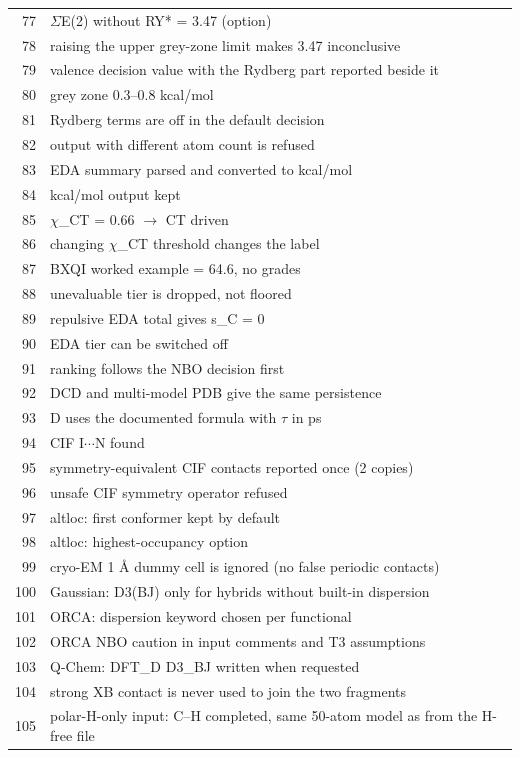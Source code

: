 {\begin{longtable}{rp{14.5cm}}
77 & $\Sigma$E(2) without RY* = 3.47 (option)\\
78 & raising the upper grey-zone limit makes 3.47 inconclusive\\
79 & valence decision value with the Rydberg part reported beside it\\
80 & grey zone 0.3--0.8 kcal/mol\\
81 & Rydberg terms are off in the default decision\\
82 & output with different atom count is refused\\
83 & EDA summary parsed and converted to kcal/mol\\
84 & kcal/mol output kept\\
85 & $\chi$\_CT = 0.66 $\to$ CT driven\\
86 & changing $\chi$\_CT threshold changes the label\\
87 & BXQI worked example = 64.6, no grades\\
88 & unevaluable tier is dropped, not floored\\
89 & repulsive EDA total gives s\_C = 0\\
90 & EDA tier can be switched off\\
91 & ranking follows the NBO decision first\\
92 & DCD and multi-model PDB give the same persistence\\
93 & D uses the documented formula with $\tau$ in ps\\
94 & CIF I$\cdots$N found\\
95 & symmetry-equivalent CIF contacts reported once (2 copies)\\
96 & unsafe CIF symmetry operator refused\\
97 & altloc: first conformer kept by default\\
98 & altloc: highest-occupancy option\\
99 & cryo-EM 1 \AA{} dummy cell is ignored (no false periodic contacts)\\
100 & Gaussian: D3(BJ) only for hybrids without built-in dispersion\\
101 & ORCA: dispersion keyword chosen per functional\\
102 & ORCA NBO caution in input comments and T3 assumptions\\
103 & Q-Chem: DFT\_D D3\_BJ written when requested\\
104 & strong XB contact is never used to join the two fragments\\
105 & polar-H-only input: C--H completed, same 50-atom model as from the H-free file\\

\end{longtable}}
